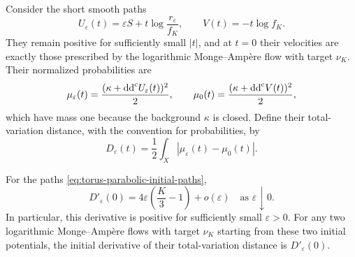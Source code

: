 Consider the short smooth paths
\begin{equation}\label{eq:torus-parabolic-initial-paths}
 U_\varepsilon(t)=\varepsilon S+t\log\frac{r_\varepsilon}{f_K},
 \qquad V(t)=-t\log f_K.
\end{equation}
They remain positive for sufficiently small $|t|$, and at $t=0$ their velocities are exactly those prescribed by the logarithmic Monge--Amp\`ere flow with target $\nu_K$. Their normalized probabilities are
\[
 \mu_\varepsilon(t)=\frac{(\kappa+\mathrm{dd}^{\mathrm{c}} U_\varepsilon(t))^2}2,
 \qquad \mu_0(t)=\frac{(\kappa+\mathrm{dd}^{\mathrm{c}} V(t))^2}2,
\]
which have mass one because the background $\kappa$ is closed. Define their total-variation distance, with the convention for probabilities, by
\[
 D_\varepsilon(t)
 =\frac12\int_X|\mu_\varepsilon(t)-\mu_0(t)|.
\]

\begin{proposition}\label{prop:parabolic-total-variation-growth}
For the paths \eqref{eq:torus-parabolic-initial-paths},
\[
 D'_\varepsilon(0)
 =4\varepsilon\left(\frac K3-1\right)+o(\varepsilon)
 \quad\text{as }\varepsilon\downarrow0.
\]
In particular, this derivative is positive for sufficiently small $\varepsilon>0$. For any two logarithmic Monge--Amp\`ere flows with target $\nu_K$ starting from these two initial potentials, the initial derivative of their total-variation distance is $D'_\varepsilon(0)$.
\end{proposition}
